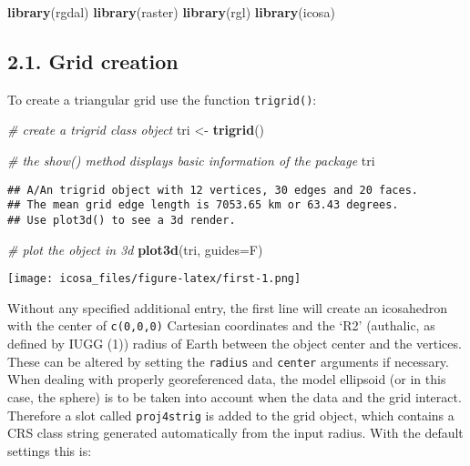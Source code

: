 \documentclass[]{article}
\newenvironment{Shaded}{\begin{snugshade}}{\end{snugshade}}
\newcommand{\KeywordTok}[1]{\textcolor[rgb]{0.13,0.29,0.53}{\textbf{#1}}}
\newcommand{\DataTypeTok}[1]{\textcolor[rgb]{0.13,0.29,0.53}{#1}}
\newcommand{\StringTok}[1]{\textcolor[rgb]{0.31,0.60,0.02}{#1}}
\newcommand{\CommentTok}[1]{\textcolor[rgb]{0.56,0.35,0.01}{\textit{#1}}}
\newcommand{\NormalTok}[1]{#1}
\begin{document}
\begin{Shaded}
\begin{Highlighting}[]
\KeywordTok{library}\NormalTok{(rgdal)}
\KeywordTok{library}\NormalTok{(raster)}
\KeywordTok{library}\NormalTok{(rgl)}
\KeywordTok{library}\NormalTok{(icosa)}
\end{Highlighting}
\end{Shaded}

\subsection{2.1. Grid creation}\label{grid-creation}

To create a triangular grid use the function \texttt{trigrid()}:

\begin{Shaded}
\begin{Highlighting}[]
\CommentTok{# create a trigrid class object}
\NormalTok{tri <-}\StringTok{ }\KeywordTok{trigrid}\NormalTok{()}

\CommentTok{# the show() method displays basic information of the package}
\NormalTok{tri}
\end{Highlighting}
\end{Shaded}

\begin{verbatim}
## A/An trigrid object with 12 vertices, 30 edges and 20 faces.
## The mean grid edge length is 7053.65 km or 63.43 degrees.
## Use plot3d() to see a 3d render.
\end{verbatim}

\begin{Shaded}
\begin{Highlighting}[]
\CommentTok{# plot the object in 3d}
\KeywordTok{plot3d}\NormalTok{(tri, }\DataTypeTok{guides=}\NormalTok{F)}
\end{Highlighting}
\end{Shaded}

\texttt{[image: icosa\_files/figure-latex/first-1.png]}

Without any specified additional entry, the first line will create an
icosahedron with the center of \texttt{c(0,0,0)} Cartesian coordinates
and the `R2' (authalic, as defined by IUGG (1)) radius of Earth between
the object center and the vertices. These can be altered by setting the
\texttt{radius} and \texttt{center} arguments if necessary. When dealing
with properly georeferenced data, the model ellipsoid (or in this case,
the sphere) is to be taken into account when the data and the grid
interact. Therefore a slot called \texttt{proj4strig} is added to the
grid object, which contains a CRS class string generated automatically
from the input radius. With the default settings this is:
\end{document}
